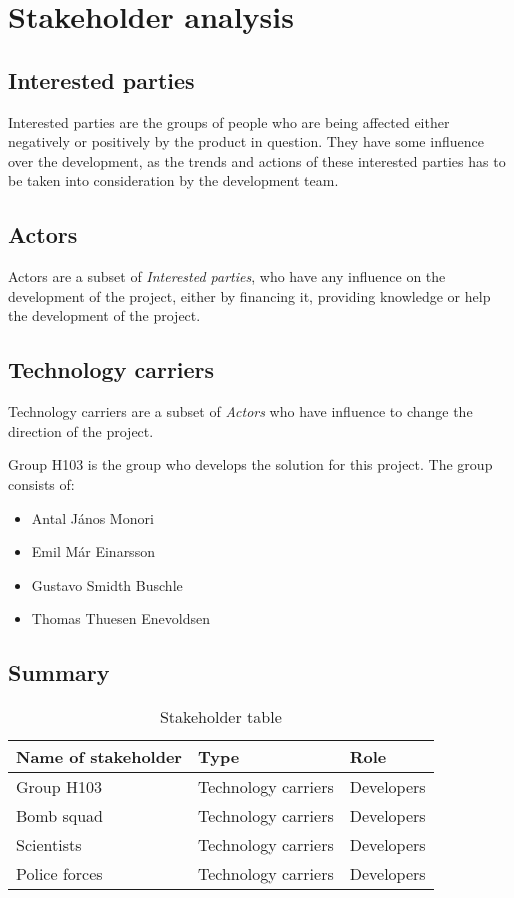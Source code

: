\section{Stakeholder analysis}
	
\subsection{Interested parties}
Interested parties are the groups of people who are being affected either negatively or positively by the product in question. They have some influence over the development, as the trends and actions of these interested parties has to be taken into consideration by the development team.

\subsection{Actors}
Actors are a subset of \textit{Interested parties}, who have any influence on the development of the project, either by financing it, providing knowledge or help the development of the project.
	
\subsection{Technology carriers}
Technology carriers are a subset of \textit{Actors} who have influence to change the direction of the project.
	
Group H103 is the group who develops the solution for this project. The group consists of:
\begin{itemize}
	\item Antal János Monori
	\item Emil Már Einarsson
	\item Gustavo Smidth Buschle
	\item Thomas Thuesen Enevoldsen
\end{itemize}

\subsection{Summary}
\begin{table}[H]
	\begin{tabular}{ | p{5cm} | l | p{5cm} |}
	   	\hline
	   	\bfseries Name of stakeholder & \bfseries Type & \bfseries Role \\ \hline
	   	Group H103 & Technology carriers & Developers \\ \hline
	   	Bomb squad & Technology carriers & Developers \\ \hline
	    Scientists & Technology carriers & Developers \\ \hline
 	   	Police forces & Technology carriers & Developers \\
	   	\hline
	\end{tabular}
	\caption{Stakeholder table}
	\label{table:stakeholdertable}
\end{table}


